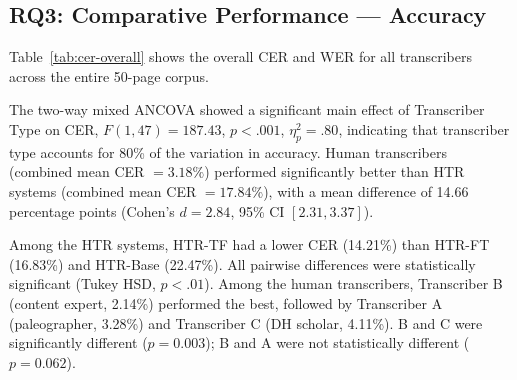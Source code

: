 \documentclass[final]{anthology-ch} %
\begin{document}
\subsection{RQ3: Comparative Performance --- Accuracy}

Table~\ref{tab:cer-overall} shows the overall CER and WER for all transcribers across the entire 50-page corpus.

\begin{table}[h]
  \centering
  \small
  \caption{Overall CER and WER by transcriber.}
  \label{tab:cer-overall}
\end{table}

The two-way mixed ANCOVA showed a significant main effect of Transcriber Type on CER, $F(1, 47) = 187.43$, $p < .001$, $\eta^2_p = .80$, indicating that transcriber type accounts for 80\% of the variation in accuracy. Human transcribers (combined mean CER $= 3.18\%$) performed significantly better than HTR systems (combined mean CER $= 17.84\%$), with a mean difference of 14.66 percentage points (Cohen's $d = 2.84$, 95\% CI $[2.31, 3.37]$).

Among the HTR systems, HTR-TF had a lower CER (14.21\%) than HTR-FT (16.83\%) and HTR-Base (22.47\%). All pairwise differences were statistically significant (Tukey HSD, $p < .01$). Among the human transcribers, Transcriber B (content expert, 2.14\%) performed the best, followed by Transcriber A (paleographer, 3.28\%) and Transcriber C (DH scholar, 4.11\%). B and C were significantly different ($p = 0.003$); B and A were not statistically different ($p = 0.062$).
\end{document}
